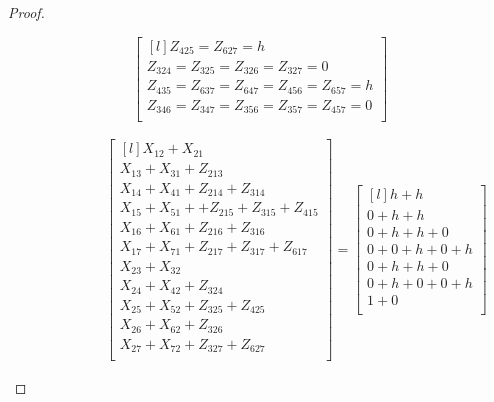 \begin{proof}
\begin{figure}[ht]
{\begin{subfigure}{0.9\textwidth}
\begin{equation}
\begin{bmatrix*}[l]
            Z_{425}=Z_{627}=h \\
            Z_{324}=Z_{325}=Z_{326}=Z_{327}=0 \\
        
            Z_{435}=Z_{637}=Z_{647}=Z_{456}=Z_{657}=h \\
            Z_{346}=Z_{347}=Z_{356}=Z_{357}=Z_{457}=0 \\
        \end{bmatrix*}
        \end{equation}
        
    \end{subfigure}
    }
    
    {\footnotesize
    \begin{subfigure}{0.9\textwidth}
        \begin{equation}
        \label{equation_vertex_opt_inequalities}
        \begin{split} %
        &
            \begin{bmatrix*}[l]
            X_{12}+X_{21} \\
            X_{13}+X_{31} + Z_{213} \\
            X_{14}+X_{41} + Z_{214} + Z_{314} \\
            X_{15}+X_{51} + + Z_{215} + Z_{315} + Z_{415} \\
            X_{16}+X_{61} + Z_{216} + Z_{316} \\
            X_{17}+X_{71} + Z_{217} + Z_{317} + Z_{617} \\
            X_{23}+X_{32} \\
            X_{24}+X_{42} + Z_{324} \\
            X_{25}+X_{52} + Z_{325}+ Z_{425} \\
            X_{26}+X_{62} + Z_{326} \\
            X_{27}+X_{72} + Z_{327} + Z_{627} \\
            \end{bmatrix*}
        =
            \begin{bmatrix*}[l]
            h+h \\
            0+h+h \\
            0+h+h+0\\
            0+0+h+0+h\\
            0+h+h+0\\
            0+h+0+0+h\\
            1+0\\

\end{bmatrix*}
\end{split}
\end{equation}
\end{subfigure}}
\end{figure}
\end{proof}
